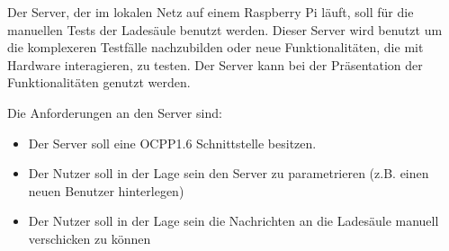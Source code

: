 Der Server, der im lokalen Netz auf einem Raspberry Pi läuft, soll für die manuellen Tests der Ladesäule benutzt werden.
Dieser Server wird benutzt um die komplexeren Testfälle nachzubilden oder neue Funktionalitäten, die mit Hardware interagieren, zu testen.
Der Server kann bei der Präsentation der Funktionalitäten genutzt werden.

Die Anforderungen an den Server sind:
\begin{itemize}
    \item Der Server soll eine OCPP1.6 Schnittstelle besitzen.
    \item Der Nutzer soll in der Lage sein den Server zu parametrieren (z.B. einen neuen Benutzer hinterlegen)
    \item Der Nutzer soll in der Lage sein die Nachrichten an die Ladesäule manuell verschicken zu können
\end{itemize}